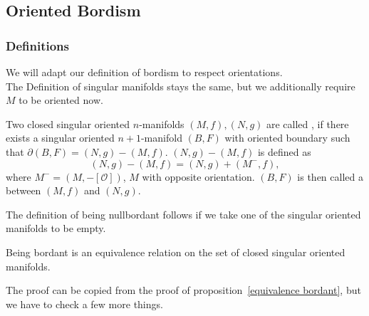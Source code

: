 \documentclass[a4paper,11pt]{article}
\begin{document}

\subsection{Oriented Bordism}

\subsubsection{Definitions}

We will adapt our definition of bordism to respect orientations.\\
The Definition of singular manifolds stays the same, but we additionally require \(M\) to be oriented now.

\begin{definition}
    Two closed singular oriented \(n\)-manifolds \((M,f),(N,g)\) are called , if there exists a singular oriented \(n+1\)-manifold \((B,F)\) with oriented boundary such that \(\partial (B,F) = (N,g)-(M,f)\). \((N,g)-(M,f)\) is defined as
    \[(N,g)-(M,f)=(N,g)+(M^-,f),\]
    where \(M^-=(M,-[\mathcal{O}])\), \(M\) with opposite orientation. \((B,F)\) is then called a  between \((M,f)\) and \((N,g)\).
\end{definition}

\begin{remark}
    The definition of being nullbordant follows if we take one of the singular oriented manifolds to be empty.
\end{remark}

\begin{proposition}\label{oriented eq. rel}
    Being bordant is an equivalence relation on the set of closed singular oriented manifolds.
\end{proposition}

The proof can be copied from the proof of proposition\ \ref{equivalence bordant}, but we have to check a few more things.
\end{document}
